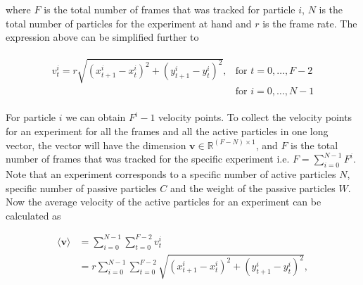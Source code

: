where $F$ is the total number of frames that was tracked for particle $i$, $N$ is the total number of 
particles for the experiment at hand and $r$ is the frame rate. 
The expression above can be simplified further to

\begin{align}
    \begin{array}{lr}
        v_t^i = r\sqrt{\left(x_{t+1}^i-x_t^i\right)^2+\left(y_{t+1}^i-y_t^i\right)^2}, 
        & \text{for } t=0,\ldots,F-2\\
        & \text{for } i=0,\ldots,N-1
    \end{array}
    \label{eq:velocity_1par2}
\end{align}

For particle $i$ we can obtain $F^i-1$ velocity points. To collect the velocity points 
for an experiment for all the frames and all the active particles in one long vector, the
vector will have the dimension $\bm{v}\in\mathbb{R}^{(F-N)\times1}$, and $F$ is the total 
number of frames that was tracked for the specific experiment i.e. $F=\sum_{i=0}^{N-1}F^i$. 
Note that an experiment corresponds to a specific number of active particles $N$, 
specific number of passive particles $C$ and the weight of the passive particles $W$.
Now  the average velocity of the active particles for an experiment can be calculated as

\begin{align}
        \langle\bm{v}\rangle    &=   \sum_{i=0}^{N-1}\sum_{t=0}^{F-2}v_t^i \\
                                &=   r\sum_{i=0}^{N-1}\sum_{t=0}^{F-2}\sqrt{\left(x_{t+1}^i-x_t^i\right)^2+\left(y_{t+1}^i-y_t^i\right)^2}, 
    \label{eq:velocity_average}
\end{align}
